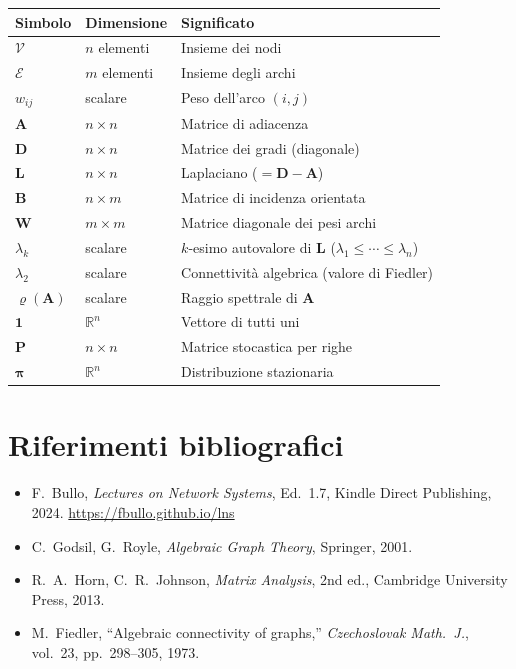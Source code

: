 \documentclass[a4paper,11pt]{article}
\theoremstyle{definition}
\theoremstyle{plain}
\theoremstyle{remark}
\newcommand{\R}{\mathbb{R}}
\newcommand{\mat}[1]{\mathbf{#1}}
\newcommand{\vect}[1]{\bm{#1}}
\newcommand{\ones}{\mathbf{1}}
\begin{document}
\begin{center}
\renewcommand{\arraystretch}{1.35}
\begin{tabular}{lll}
\toprule
\textbf{Simbolo} & \textbf{Dimensione} & \textbf{Significato} \\
\midrule
$\mathcal{V}$    & $n$ elementi        & Insieme dei nodi \\
$\mathcal{E}$    & $m$ elementi        & Insieme degli archi \\
$w_{ij}$         & scalare             & Peso dell'arco $(i,j)$ \\
$\mat{A}$        & $n \times n$        & Matrice di adiacenza \\
$\mat{D}$        & $n \times n$        & Matrice dei gradi (diagonale) \\
$\mat{L}$        & $n \times n$        & Laplaciano ($= \mat{D}-\mat{A}$) \\
$\mat{B}$        & $n \times m$        & Matrice di incidenza orientata \\
$\mat{W}$        & $m \times m$        & Matrice diagonale dei pesi archi \\
$\lambda_k$      & scalare             & $k$-esimo autovalore di $\mat{L}$ ($\lambda_1 \leq \cdots \leq \lambda_n$) \\
$\lambda_2$      & scalare             & Connettività algebrica (valore di Fiedler) \\
$\varrho(\mat{A})$ & scalare           & Raggio spettrale di $\mat{A}$ \\
$\ones$          & $\R^n$              & Vettore di tutti uni \\
$\mat{P}$        & $n\times n$         & Matrice stocastica per righe \\
$\vect{\pi}$     & $\R^n$              & Distribuzione stazionaria \\
\bottomrule
\end{tabular}
\end{center}

\section*{Riferimenti bibliografici}

\begin{itemize}[noitemsep]
  \item F.~Bullo, \textit{Lectures on Network Systems}, Ed.~1.7,
        Kindle Direct Publishing, 2024.
        \url{https://fbullo.github.io/lns}

  \item C.~Godsil, G.~Royle, \textit{Algebraic Graph Theory},
        Springer, 2001.

  \item R.~A.~Horn, C.~R.~Johnson, \textit{Matrix Analysis},
        2nd ed., Cambridge University Press, 2013.

  \item M.~Fiedler, ``Algebraic connectivity of graphs,''
        \textit{Czechoslovak Math.\ J.}, vol.~23, pp.~298--305, 1973.
\end{itemize}
\end{document}

